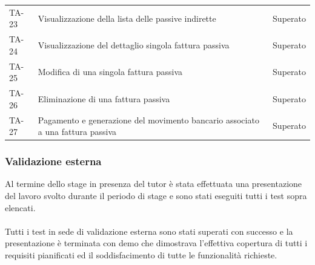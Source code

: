 \begin{table}[H]
\begin{tabularx}{\textwidth}{lXl}
TA-23 & Visualizzazione della lista delle passive indirette & Superato\\
TA-24 & Visualizzazione del dettaglio singola fattura passiva & Superato\\
TA-25 & Modifica di una singola fattura passiva & Superato\\
TA-26 & Eliminazione di una fattura passiva & Superato\\
TA-27 & Pagamento e generazione del movimento bancario associato a una fattura passiva & Superato\\
\hline
\end{tabularx}
\end{table}%

\subsubsection{Validazione esterna}
Al termine dello stage in presenza del tutor è stata effettuata una presentazione del lavoro svolto durante il periodo di stage e sono stati eseguiti tutti i test sopra elencati.\\
\paragraph{}
Tutti i test in sede di validazione esterna sono stati superati con
successo e la presentazione è terminata con demo che dimostrava l’effettiva copertura di tutti i requisiti pianificati ed il soddisfacimento di tutte le funzionalità richieste.\\
